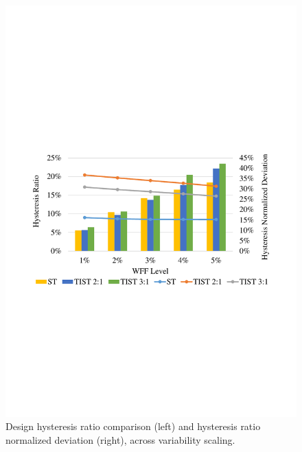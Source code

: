 \documentclass[pgmicro,mestrado,english]{iiufrgs}
\begin{document}
    \begin{figure}[]
        \centering
            \includegraphics[width=1\textwidth, trim={1.25cm 9cm 2cm 10cm}, clip]{hystWFFComp.pdf}
            \caption{Design hysteresis ratio comparison (left) and hysteresis ratio normalized deviation (right), across variability scaling.}
        \label{figsHystComp}
    \end{figure}
    
\end{document}
